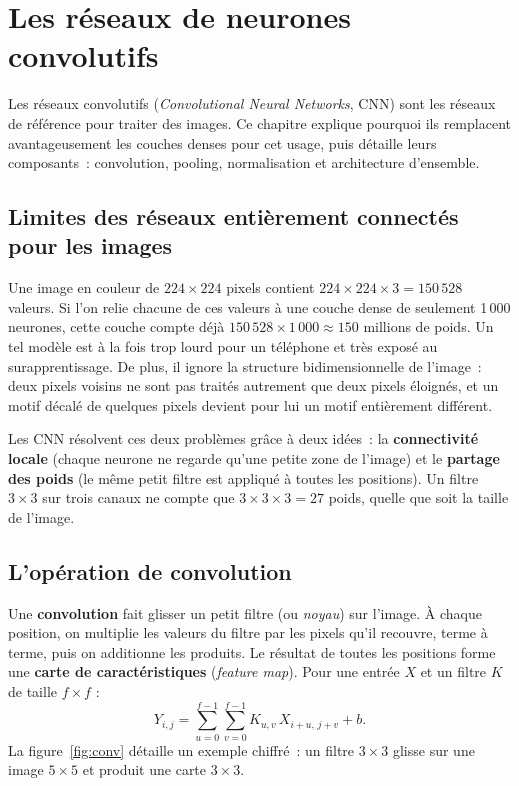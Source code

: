 \chapter{Les réseaux de neurones convolutifs}\label{chap:cnn}

Les réseaux convolutifs (\emph{Convolutional Neural Networks}, CNN) sont les réseaux de référence pour traiter des images. Ce chapitre explique pourquoi ils remplacent avantageusement les couches denses pour cet usage, puis détaille leurs composants~: convolution, pooling, normalisation et architecture d’ensemble.

\section{Limites des réseaux entièrement connectés pour les images}

Une image en couleur de $224\times224$ pixels contient $224\times224\times3=150\,528$ valeurs. Si l’on relie chacune de ces valeurs à une couche dense de seulement 1\,000 neurones, cette couche compte déjà $150\,528\times1\,000\approx150$ millions de poids. Un tel modèle est à la fois trop lourd pour un téléphone et très exposé au surapprentissage. De plus, il ignore la structure bidimensionnelle de l’image~: deux pixels voisins ne sont pas traités autrement que deux pixels éloignés, et un motif décalé de quelques pixels devient pour lui un motif entièrement différent.

Les CNN résolvent ces deux problèmes grâce à deux idées~: la \textbf{connectivité locale} (chaque neurone ne regarde qu’une petite zone de l’image) et le \textbf{partage des poids} (le même petit filtre est appliqué à toutes les positions). Un filtre $3\times3$ sur trois canaux ne compte que $3\times3\times3=27$ poids, quelle que soit la taille de l’image.

\section{L’opération de convolution}

Une \textbf{convolution} fait glisser un petit filtre (ou \emph{noyau}) sur l’image. À chaque position, on multiplie les valeurs du filtre par les pixels qu’il recouvre, terme à terme, puis on additionne les produits. Le résultat de toutes les positions forme une \textbf{carte de caractéristiques} (\emph{feature map}). Pour une entrée $X$ et un filtre $K$ de taille $f\times f$ :
\begin{equation}
  Y_{i,j} = \sum_{u=0}^{f-1}\sum_{v=0}^{f-1} K_{u,v}\,X_{i+u,\,j+v} + b.
\end{equation}
La figure~\ref{fig:conv} détaille un exemple chiffré~: un filtre $3\times3$ glisse sur une image $5\times5$ et produit une carte $3\times3$.

